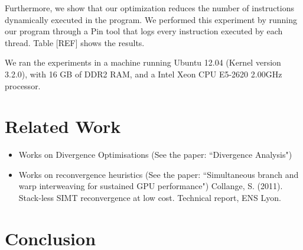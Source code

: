 \documentclass[times,10pt,twocolumn]{article}
\begin{document}

Furthermore, we show that our optimization reduces the number of instructions
dynamically executed in the program.
We performed this experiment by running our program through a Pin tool that logs
every instruction executed by each thread. Table [REF] shows the results.


We ran the experiments in a machine running Ubuntu 12.04 (Kernel version 3.2.0), with 16 GB of DDR2 RAM, and a Intel Xeon CPU E5-2620 2.00GHz processor.

\section{Related Work}
\label{sec:rw}

\begin{itemize}
\item Works on Divergence Optimisations (See the paper: ``Divergence Analysis")
\item Works on reconvergence heuristics (See the paper: ``Simultaneous branch and warp interweaving for sustained GPU performance")
Collange, S. (2011). Stack-less SIMT reconvergence at low cost. Technical report, ENS Lyon.
\end{itemize}

\section{Conclusion}
\label{sec:con}



\end{document}
